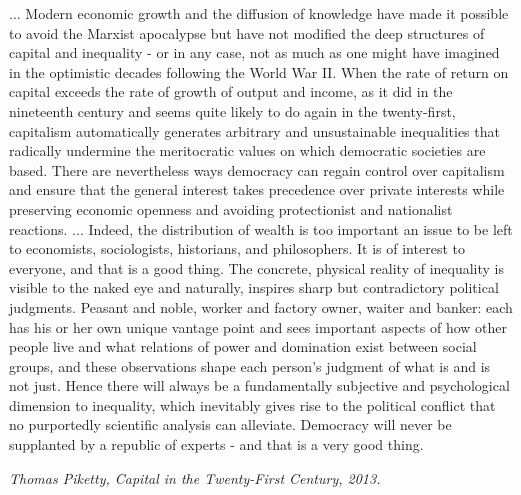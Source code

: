 \documentclass{UCF_ETD}
\begin{document}
\epigraph{... Modern economic growth and the diffusion of knowledge have made it possible to avoid the Marxist apocalypse but have not modified the deep structures of capital and inequality - or in any case, not as much as one might have imagined in the optimistic decades following the World War II. When the rate of return on capital exceeds the rate of growth of output and income, as it did in the nineteenth century and seems quite likely to do again in the twenty-first, capitalism automatically generates arbitrary and unsustainable inequalities that radically undermine the meritocratic values on which democratic societies are based. There are nevertheless ways democracy can regain control over capitalism and ensure that the general interest takes precedence over private interests while preserving economic openness and avoiding protectionist and nationalist reactions.  
... Indeed, the distribution of wealth is too important an issue to be left to economists, sociologists, historians, and philosophers. It is of interest to everyone, and that is a good thing. The concrete, physical reality of inequality is visible to the naked eye and naturally, inspires sharp but contradictory political judgments. Peasant and noble, worker and factory owner, waiter and banker: each has his or her own unique vantage point and sees important aspects of how other people live and what relations of power and domination exist between social groups, and these observations shape each person's judgment of what is and is not just. Hence there will always be a fundamentally subjective and psychological dimension to inequality, which inevitably gives rise to the political conflict that no purportedly scientific analysis can alleviate. Democracy will never be supplanted by a republic of experts - and that is a very good thing.}{\itshape Thomas Piketty, Capital in the Twenty-First Century, 2013.}
\end{document}
